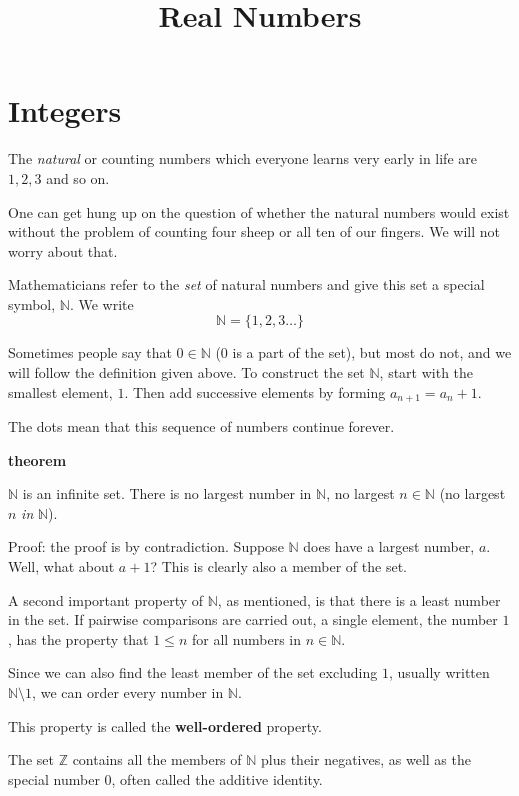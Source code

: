 \documentclass[11pt, oneside]{article}
\title{Real Numbers}
\date{}
\begin{document}
\maketitle
\Large
\section*{Integers}

The \emph{natural} or counting numbers which everyone learns very early in life are $1, 2, 3$ and so on.

One can get hung up on the question of whether the natural numbers would exist without the problem of counting four sheep or all ten of our fingers.  We will not worry about that.

Mathematicians refer to the \emph{set} of natural numbers and give this set a special symbol, $\mathbb{N}$.  We write
\[ \mathbb{N} = \{ 1, 2, 3 \dots \} \]

Sometimes people say that $0 \in \mathbb{N}$ (0 is a part of the set), but most do not, and we will follow the definition given above.  To construct the set $\mathbb{N}$, start with the smallest element, $1$.  Then add successive elements by forming $a_{n+1} = a_n + 1$.

The dots mean that this sequence of numbers continue forever.  

\textbf{theorem}

$\mathbb{N}$ is an infinite set.  There is no largest number in $\mathbb{N}$, no largest $n \in \mathbb{N}$ (no largest $n$ \emph{in} $\mathbb{N}$).

Proof:  the proof is by contradiction.  Suppose $\mathbb{N}$ does have a largest number, $a$.  Well, what about $a + 1$?  This is clearly also a member of the set.

A second important property of $\mathbb{N}$, as mentioned, is that there is a least number in the set.  If pairwise comparisons are carried out, a single element, the number $1$, has the property that $1 \le n$ for all numbers in $n \in \mathbb{N}$.

Since we can also find the least member of the set excluding $1$, usually written $\mathbb{N} \setminus 1$, we can order every number in $\mathbb{N}$.  

This property is called the \textbf{well-ordered} property.

The set $\mathbb{Z}$ contains all the members of $\mathbb{N}$ plus their negatives, as well as the special number $0$, often called the additive identity.
\end{document}
